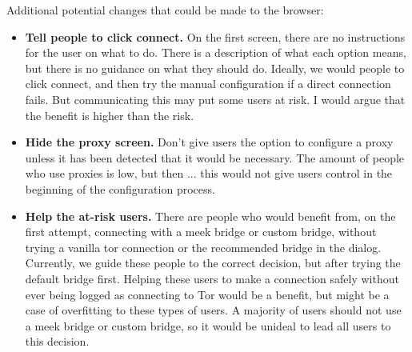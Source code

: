 \documentclass{template}
\begin{document}
Additional potential changes that could be made to the browser: 
\begin{itemize} \itemsep1pt \parskip0pt  
\item {\bfseries Tell people to click connect.} On the first screen, there are no instructions for the user on what to do. There is a description of what each option means, but there is no guidance on what they should do. Ideally, we would people to click connect, and then try the manual configuration if a direct connection fails. But communicating this may put some users at risk. I would argue that the benefit is higher than the risk. 
\item{\bfseries Hide the proxy screen.} Don't give users the option to configure a proxy unless it has been detected that it would be necessary. The amount of people who use proxies is low, but then ... this would not give users control in the beginning of the configuration process. 
\item{\bfseries Help the at-risk users.} There are people who would benefit from, on the first attempt, connecting with a meek bridge or custom bridge, without trying a vanilla tor connection or the recommended bridge in the dialog. Currently, we guide these people to the correct decision, but after trying the default bridge first. Helping these users to make a connection safely without ever being logged as connecting to Tor would be a benefit, but might be a case of overfitting to these types of users. A majority of users should not use a meek bridge or custom bridge, so it would be unideal to lead all users to this decision.
\end{itemize} 
\end{document}

